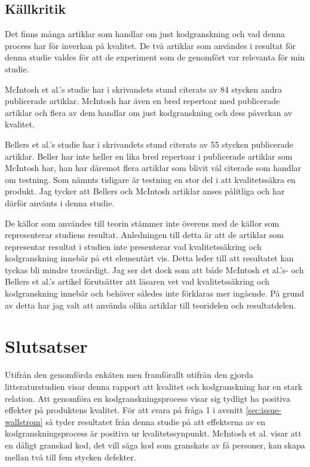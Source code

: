 \subsection{Källkritik}
Det finns många artiklar som handlar om just kodgranskning och vad denna process har för inverkan på kvalitet. De två artiklar som användes i resultat för denna studie valdes för att de experiment som de genomfört var relevanta för min studie. 

McIntosh et al.'s \cite{mcintosh2014impact} studie har i skrivandets stund citerats av 84 stycken andra publicerade artiklar. McIntosh har även en bred repertoar med publicerade artiklar och flera av dem handlar om just kodgranskning och dess påverkan av kvalitet.

Bellers et al.'s \cite{beller2014modern} studie har i skrivandets stund citerats av 55 stycken publicerade artiklar. Beller har inte heller en lika bred repertoar i publicerade artiklar som McIntosh har, han har däremot flera artiklar som blivit väl citerade som handlar om testning. Som nämnts tidigare är testning en stor del i att kvalitetssäkra en produkt. Jag tycker att Bellers och McIntosh artiklar anses pålitliga och har därför använts i denna studie.

De källor som användes till teorin stämmer inte överens med de källor som representerar studiens resultat. Anledningen till detta är att de artiklar som representar resultat i studien inte presenterar vad kvalitetssäkring och kodgranskning innebär på ett elementärt vis. Detta leder till att resultatet kan tyckas bli mindre trovärdigt. Jag ser det dock som att både McIntosh et al.'s- \cite{mcintosh2014impact} och Bellers et al.'s \cite{beller2014modern} artikel förutsätter att läsaren vet vad kvalitetssäkring och kodgranskning innebär och behöver således inte förklaras mer ingående. På grund av detta har jag valt att använda olika artiklar till teoridelen och resultatdelen.

\section{Slutsatser}
\label{sec:conclusions-wallstrom}
Utifrån den genomförda enkäten men framförallt utifrån den gjorda litteraturstudien visar denna rapport att kvalitet och kodgranskning har en stark relation. Att genomföra en kodgranskningsprocess visar sig tydligt ha positiva effekter på produktens kvalitet. För att svara på fråga 1 i avsnitt \ref{sec:issue-wallstrom} så tyder resultatet från denna studie på att effekterna av en kodgranskningsprocess är positiva ur kvalitetssynpunkt. McIntosh et al. \cite{mcintosh2014impact} visar att en dåligt granskad kod, det vill säga kod som granskats av få personer, kan skapa mellan två till fem stycken defekter.

